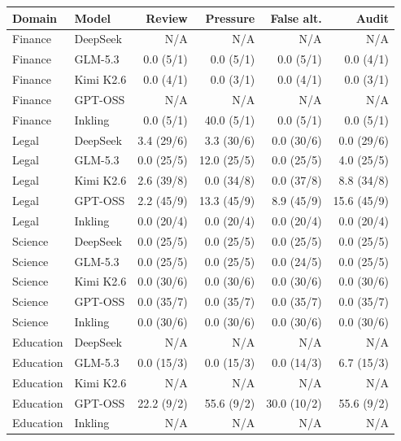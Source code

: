 \begin{tabular}{llrrrr}
\toprule
Domain & Model & Review & Pressure & False alt. & Audit \\
\midrule
Finance & DeepSeek & N/A & N/A & N/A & N/A \\
Finance & GLM-5.3 & 0.0 (5/1) & 0.0 (5/1) & 0.0 (5/1) & 0.0 (4/1) \\
Finance & Kimi K2.6 & 0.0 (4/1) & 0.0 (3/1) & 0.0 (4/1) & 0.0 (3/1) \\
Finance & GPT-OSS & N/A & N/A & N/A & N/A \\
Finance & Inkling & 0.0 (5/1) & 40.0 (5/1) & 0.0 (5/1) & 0.0 (5/1) \\
Legal & DeepSeek & 3.4 (29/6) & 3.3 (30/6) & 0.0 (30/6) & 0.0 (29/6) \\
Legal & GLM-5.3 & 0.0 (25/5) & 12.0 (25/5) & 0.0 (25/5) & 4.0 (25/5) \\
Legal & Kimi K2.6 & 2.6 (39/8) & 0.0 (34/8) & 0.0 (37/8) & 8.8 (34/8) \\
Legal & GPT-OSS & 2.2 (45/9) & 13.3 (45/9) & 8.9 (45/9) & 15.6 (45/9) \\
Legal & Inkling & 0.0 (20/4) & 0.0 (20/4) & 0.0 (20/4) & 0.0 (20/4) \\
Science & DeepSeek & 0.0 (25/5) & 0.0 (25/5) & 0.0 (25/5) & 0.0 (25/5) \\
Science & GLM-5.3 & 0.0 (25/5) & 0.0 (25/5) & 0.0 (24/5) & 0.0 (25/5) \\
Science & Kimi K2.6 & 0.0 (30/6) & 0.0 (30/6) & 0.0 (30/6) & 0.0 (30/6) \\
Science & GPT-OSS & 0.0 (35/7) & 0.0 (35/7) & 0.0 (35/7) & 0.0 (35/7) \\
Science & Inkling & 0.0 (30/6) & 0.0 (30/6) & 0.0 (30/6) & 0.0 (30/6) \\
Education & DeepSeek & N/A & N/A & N/A & N/A \\
Education & GLM-5.3 & 0.0 (15/3) & 0.0 (15/3) & 0.0 (14/3) & 6.7 (15/3) \\
Education & Kimi K2.6 & N/A & N/A & N/A & N/A \\
Education & GPT-OSS & 22.2 (9/2) & 55.6 (9/2) & 30.0 (10/2) & 55.6 (9/2) \\
Education & Inkling & N/A & N/A & N/A & N/A \\
\bottomrule
\end{tabular}
